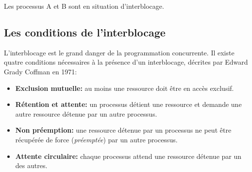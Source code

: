 \documentclass[a4paper,11pt]{article}
\begin{document}
\begin{Form}
\begin{center}
\end{center}
\begin{center}
\end{center}
Les processus A et B sont en situation d'interblocage.
\subsection{Les conditions de l'interblocage}
L'interblocage est le grand danger de la programmation concurrente. Il existe quatre conditions nécessaires à la présence d'un interblocage, décrites par Edward Grady Coffman en 1971:
\begin{itemize}
\item \textbf{Exclusion mutuelle:} au moins une ressource doit être en accès exclusif.
\item \textbf{Rétention et attente:} un processus détient une ressource et demande une autre ressource détenue par un autre processus.
\item \textbf{Non préemption:} une ressource détenue par un processus ne peut être récupérée de force (\emph{préemptée}) par un autre processus.
\item \textbf{Attente circulaire:} chaque processus attend une ressource détenue par un des autres.
\end{itemize}

\end{Form}
\end{document}
